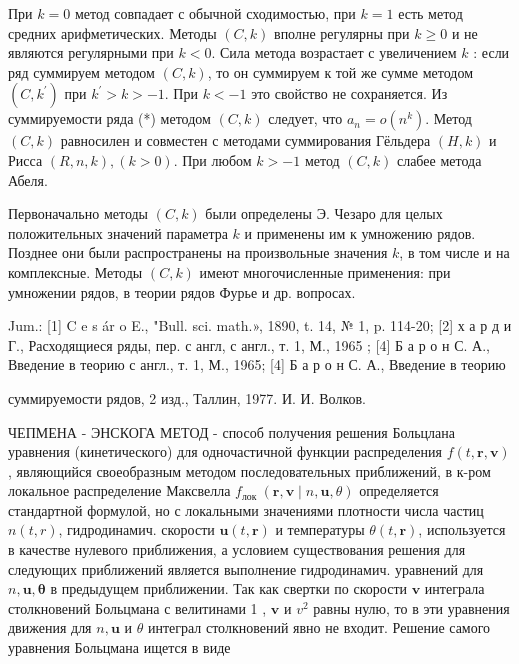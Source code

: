 \documentclass[10pt]{article}
\begin{document}
При $k=0$ метод совпадает с обычной сходимостью, при $k=1$ есть метод средних арифметических. Методы $(C, k)$ вполне регулярны при $k \geqslant 0$ и не являются регулярными при $k<0$. Сила метода возрастает с увеличением $k$ : если ряд суммируем методом $(C, k)$, то он суммируем к той же сумме методом $\left(C, k^{\prime}\right)$ при $k^{\prime}>k>-1$. При $k<-1$ это свойство не сохраняется. Из суммируемости ряда (*) методом $(C, k)$ следует, что $a_{n}=o\left(n^{k}\right)$. Метод $(C, k)$ равносилен и совместен с методами суммирования Гёльдера $(H, k)$ и Рисса $(R, n, k),(k>0)$. При любом $k>-1$ метод $(C, k)$ слабее метода Абеля.



Первоначально методы $(C, k)$ были определены Э. Чезаро для целых положительных значений параметра $k$ и применены им к умножению рядов. Позднее они были распространены на произвольные значения $k$, в том числе и на комплексные. Методы $(C, k)$ имеют многочисленные применения: при умножении рядов, в теории рядов Фурье и др. вопросах.



Jum.: [1] C e s ár o E., "Bull. sci. math.», 1890, t. 14, № 1, p. 114-20; [2] х а р д и Г., Расходящиеся ряды, пер. с англ, с англ., т. 1, М., 1965 ; [4] Б а р о н С. А., Введение в теорию с англ., т. 1, М., 1965; [4] Б а р о н С. А., Введение в теорию

суммируемости рядов, 2 изд., Таллин, 1977. И. И. Волков.



ЧЕПМЕНА - ЭНСКОГА МЕТОД - способ получения решения Больцлана уравнения (кинетического) для одночастичной функции распределения $f(t, \boldsymbol{r}, \boldsymbol{v})$, являющийся своеобразным методом последовательных приближений, в к-ром локальное распределение Максвелла $f_{\text {лок }}(\boldsymbol{r}, \boldsymbol{v} \mid n, \boldsymbol{u}, \theta)$ определяется стандартной формулой, но с локальными значениями плотности числа частиц $n(t, r)$, гидродинамич. скорости $\boldsymbol{u}(t, \boldsymbol{r})$ и температуры $\theta(t, \boldsymbol{r})$, используется в качестве нулевого приближения, а условием существования решения для следующих приближений является выполнение гидродинамич. уравнений для $n, \boldsymbol{u}, \boldsymbol{\theta}$ в предыдущем приближении. Так как свертки по скорости $\boldsymbol{v}$ интеграла столкновений Больцмана с велитинами 1 , $\boldsymbol{v}$ и $v^{2}$ равны нулю, то в эти уравнения движения для $n, \boldsymbol{u}$ и $\theta$ интеграл столкновений явно не входит. Решение самого уравнения Больцмана ищется в виде
\end{document}
